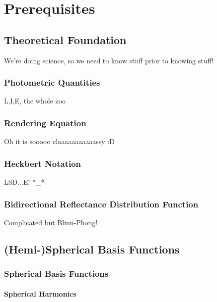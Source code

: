 \documentclass[thesis.tex]{subfiles}
\begin{document}
\chapter{Prerequisites}\label{chap:basics}

\section{Theoretical Foundation}
We're doing science, so we need to know stuff prior to knowing stuff!

\subsection{Photometric Quantities}
L,I,E, the whole zoo

\subsection{Rendering Equation}
Oh it is sooooo claaaaaaaaaaassy :D

\subsection{Heckbert Notation}
LSD...E! *\_*

\subsection{Bidirectional Reflectance Distribution Function}
Complicated but Blinn-Phong!

\section{(Hemi-)Spherical Basis Functions}


\subsection{Spherical Basis Functions}
\subsubsection{Spherical Harmonics}
\end{document}
